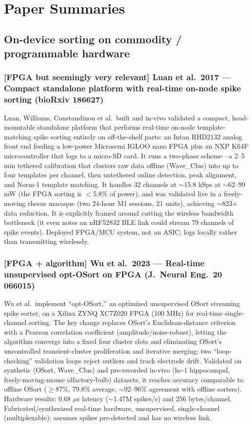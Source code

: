 \documentclass[11pt]{article}
\begin{document}
\section*{Paper Summaries}

\subsection*{On-device sorting on commodity / programmable hardware}

\subsubsection*{[FPGA but seemingly very relevant] Luan et al.\ 2017 --- Compact standalone platform with real-time on-node spike sorting (bioRxiv 186627)}
Luan, Williams, Constandinou et al.\ built and in-vivo validated a compact, head-mountable standalone platform that performs real-time on-node template-matching spike sorting entirely on off-the-shelf parts: an Intan RHD2132 analog front end feeding a low-power Microsemi IGLOO nano FPGA plus an NXP K64F microcontroller that logs to a micro-SD card. It runs a two-phase scheme---a 2--5 min tethered calibration that clusters raw data offline (Wave\_Clus) into up to four templates per channel, then untethered online detection, peak alignment, and Norm-1 template matching. It handles 32 channels at $\sim$15.8 kSps at $\sim$62--99 mW (the FPGA sorting is $<$5.8\% of power), and was validated live in a freely-moving rhesus macaque (two 24-hour M1 sessions, 21 units), achieving $\sim$823$\times$ data reduction. It is explicitly framed around cutting the wireless bandwidth bottleneck (it even notes an nRF52832 BLE link could stream 79 channels of spike events). Deployed FPGA/MCU system, not an ASIC; logs locally rather than transmitting wirelessly.

\subsubsection*{[FPGA + algorithm] Wu et al.\ 2023 --- Real-time unsupervised opt-OSort on FPGA (J.\ Neural Eng.\ 20 066015)}
Wu et al.\ implement ``opt-OSort,'' an optimized unsupervised OSort streaming spike sorter, on a Xilinx ZYNQ XC7Z020 FPGA (100 MHz) for real-time single-channel sorting. The key change replaces OSort's Euclidean-distance criterion with a Pearson correlation coefficient (amplitude/noise-robust), letting the algorithm converge into a fixed four cluster slots and eliminating OSort's uncontrolled transient-cluster proliferation and iterative merging; two ``loop-checking'' validation loops reject outliers and track electrode drift. Validated on synthetic (OSort, Wave\_Clus) and pre-recorded in-vivo (hc-1 hippocampal, freely-moving-mouse olfactory-bulb) datasets, it reaches accuracy comparable to offline OSort ($\geq$87\%, 79.8\% average, $\sim$92--96\% agreement with offline sorters). Hardware results: 0.68 $\mu$s latency ($\sim$1.47M spikes/s) and 256 bytes/channel. Fabricated/synthesized real-time hardware, unsupervised, single-channel (multiplexable); assumes spikes pre-detected and has no wireless link.
\end{document}
